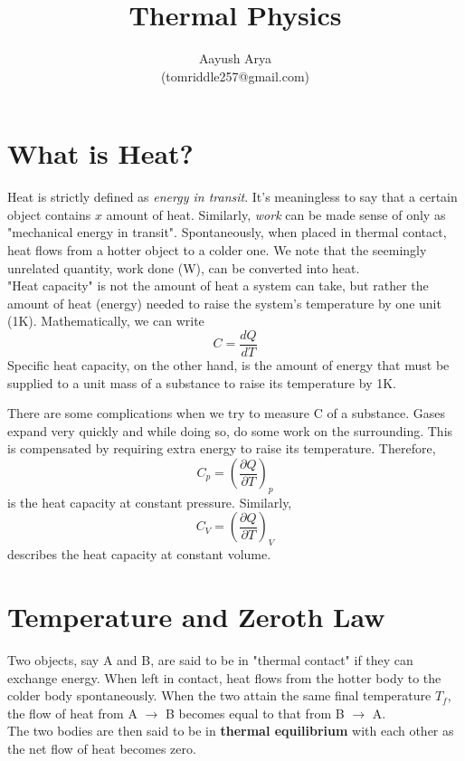 \documentclass{article}
\title{Thermal Physics}
\author{Aayush Arya\\ (tomriddle257@gmail.com)}
\begin{document}
	
	\maketitle
	
	\section{What is Heat?}
	Heat is strictly defined as \textit{energy in transit}. It's meaningless to say that a certain object contains $x$ amount of heat. Similarly, \textit{work} can be made sense of only as "mechanical energy in transit". Spontaneously, when placed in thermal contact, heat flows from a hotter object to a colder one. We note that the seemingly unrelated quantity, work done (W), can be converted into heat. \\
	
	"Heat capacity" is not the amount of heat a system can take, but rather the amount of heat (energy) needed to raise the system's temperature by one unit (1K). Mathematically, we can write
	$$ C = \frac{dQ}{dT}$$
	Specific heat capacity, on the other hand, is the amount of energy that must be supplied to a unit mass of a substance to raise its temperature by 1K.
	
	There are some complications when we try to measure C of a substance. Gases expand very quickly and while doing so, do some work on the surrounding. This is compensated by requiring extra energy to raise its temperature. Therefore,
	$$ C_p = \left(\frac{\partial Q}{\partial T}\right)_p $$
	is the heat capacity at constant pressure. Similarly,
	\begin{equation*}
	C_V = \left(\frac{\partial Q}{\partial T}\right)_V
	\end{equation*}
	 describes the heat capacity at constant volume.
	 
	 \section{Temperature and Zeroth Law}
	 Two objects, say A and B, are said to be in "thermal contact" if they can exchange energy. When left in contact, heat flows from the hotter body to the colder body spontaneously. When the two attain the same final temperature $T_f$, the flow of heat from A $\rightarrow$ B becomes equal to that from B $\rightarrow$ A.\\
	 The two bodies are then said to be in \textbf{thermal equilibrium} with each other as the net flow of heat becomes zero. \\
	 
\end{document}
